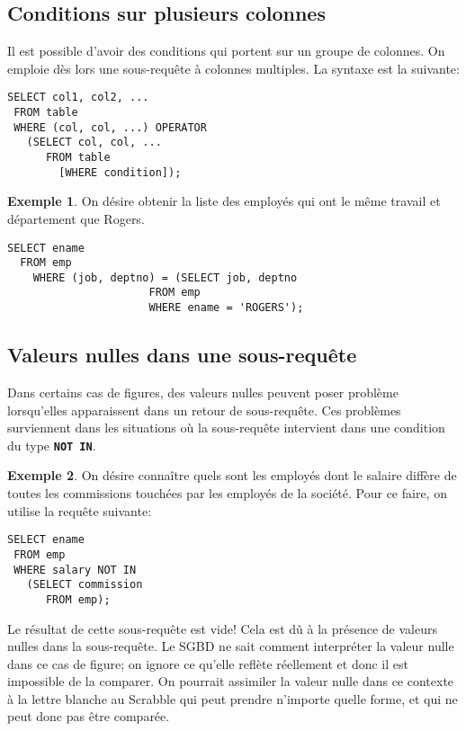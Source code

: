 \documentclass[a4paper, 12pt]{report}
\newcommand{\textSQL}[1]{\texttt{\textbf{#1}}}
\theoremstyle{definition} \newtheorem{ex}{Exemple}
\begin{document}
\subsection{Conditions sur plusieurs colonnes}
Il est possible d'avoir des conditions qui portent sur un groupe de colonnes. On emploie dès lors une sous-requête à colonnes multiples. La syntaxe est la suivante:
\begin{lstlisting}[frame=single]
SELECT col1, col2, ...
 FROM table
 WHERE (col, col, ...) OPERATOR
   (SELECT col, col, ...
	  FROM table
		[WHERE condition]);
\end{lstlisting}
\begin{ex}
On désire obtenir la liste des employés qui ont le même travail et département que Rogers.
	\begin{lstlisting}[frame=single]
SELECT ename
  FROM emp
	WHERE (job, deptno) = (SELECT job, deptno
		              FROM emp
		              WHERE ename = 'ROGERS');
	\end{lstlisting}
\end{ex}

\subsection{Valeurs nulles dans une sous-requête}
Dans certains cas de figures, des valeurs nulles peuvent poser problème lorsqu'elles apparaissent dans un retour de sous-requête. Ces problèmes surviennent dans les situations où la sous-requête intervient dans une condition du type \textSQL{NOT IN}.

\begin{ex}
On désire connaître quels sont les employés dont le salaire diffère de toutes les commissions touchées par les employés de la société. Pour ce faire, on utilise la requête suivante:
\begin{lstlisting}[frame=single]
SELECT ename
 FROM emp
 WHERE salary NOT IN
   (SELECT commission
	  FROM emp);
\end{lstlisting}

Le résultat de cette sous-requête est vide! Cela est dû à la présence de valeurs nulles dans la sous-requête. Le SGBD ne sait comment interpréter la valeur nulle dans ce cas de figure; on ignore ce qu'elle reflète réellement et donc il est impossible de la comparer. On pourrait assimiler la valeur nulle dans ce contexte à  la lettre blanche au Scrabble qui peut prendre n'importe quelle forme, et qui ne peut donc pas être comparée. 
\end{ex}
\end{document}
